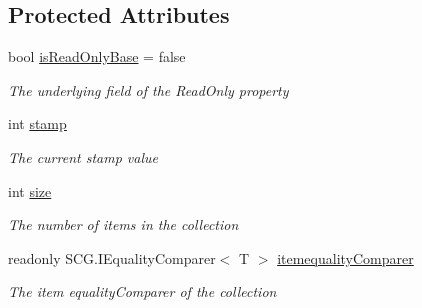 \subsection*{Protected Attributes}
\begin{DoxyCompactItemize}
\item 
bool \hyperlink{class_c5_1_1_collection_base_ae603bb5742908edb4871693723d0deda}{is\+Read\+Only\+Base} = false
\begin{DoxyCompactList}\small\item\em The underlying field of the Read\+Only property \end{DoxyCompactList}\item 
int \hyperlink{class_c5_1_1_collection_base_ae13bd5b482306a49a4d10654a9b8b064}{stamp}
\begin{DoxyCompactList}\small\item\em The current stamp value \end{DoxyCompactList}\item 
int \hyperlink{class_c5_1_1_collection_base_ab524b118754a5a8290b6528511272833}{size}
\begin{DoxyCompactList}\small\item\em The number of items in the collection \end{DoxyCompactList}\item 
readonly S\+C\+G.\+I\+Equality\+Comparer$<$ T $>$ \hyperlink{class_c5_1_1_collection_base_a95e343400be0e8f3f8d6310f1aaf2cc6}{itemequality\+Comparer}
\begin{DoxyCompactList}\small\item\em The item equality\+Comparer of the collection \end{DoxyCompactList}\end{DoxyCompactItemize}
